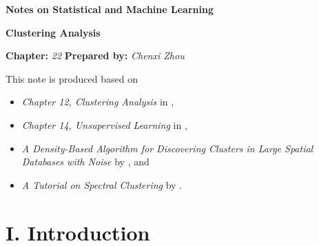 \documentclass[12pt]{article}
\newcommand{\titlebox}[4]{
\begin{tcolorbox}[colback = blue!5!white!95, colframe = blue!70!black
]
  \noindent \textbf{ #1 } \hfill \textit{#2} 
  \begin{center}
  	 \LARGE{\textbf{#3}}
  \end{center}
\textbf{Chapter:} \textit{#4} \hfill \textbf{Prepared by:} \textit{Chenxi Zhou}
\end{tcolorbox}
}
\begin{document}
\titlebox{Notes on Statistical and Machine Learning}{}{Clustering Analysis}{22}
\thispagestyle{plain}

\vspace{10pt}

This note is produced based on 
\begin{itemize}
	\item \textit{Chapter 12, Clustering Analysis} in \textcite{Izenman2009-jk}, 
	\item \textit{Chapter 14, Unsupervised Learning} in  \textcite{Friedman2001-np}, 
	\item \textit{A Density-Based Algorithm for Discovering Clusters in Large Spatial Databases with Noise} by \textcite{Ester1996-kp}, and 
	\item \textit{A Tutorial on Spectral Clustering} by \textcite{Luxburg2007-vl}. 
\end{itemize}


\section*{I. Introduction}
\end{document}
